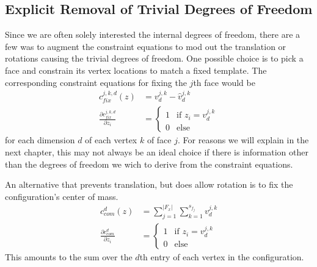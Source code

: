 \subsection{Explicit Removal of Trivial Degrees of Freedom}
\label{ssc:RemTrivDoF}
Since we are often solely interested the internal degrees of freedom, there are a few was to augment the constraint equations to mod out the translation or rotations causing the trivial degrees of freedom. One possible choice is to pick a face and constrain its vertex locations to match a fixed template. The corresponding constraint equations for fixing the $j$th face would be
\begin{align}
c_{fix}^{j,k,d}\left(z\right) &= v^{j,k}_d - \hat{v}^{j,k}_d \\
	\frac{\partial c_{fix}^{j,k,d}}{\partial z_i} &=
  	\begin{cases}
        	1 	& \text{if } z_i = v^{j,k}_d \\
   		0       & \text{else} 
  	\end{cases} 
\end{align}
for each dimension $d$ of each vertex $k$ of face $j$. For reasons we will explain in the next chapter, this may not always be an ideal choice if there is information other than the degrees of freedom we wich to derive from the constraint equations.


An alternative that prevents translation, but does allow rotation is to fix the configuration's center of mass. 
\begin{align}
c_{com}^{d}\left(z\right) &= \sum_{j = 1}^{|F_x|}\sum_{k=1}^{s_{f_j}}v^{j,k}_d \\
	\frac{\partial c_{com}^{d}}{\partial z_i} &=
  	\begin{cases}
        	1 	& \text{if } z_i = v^{j,k}_d \\
   		0       & \text{else} 
  	\end{cases} 
\end{align}
This amounts to the sum over the $d$th entry of each vertex in the configuration.



